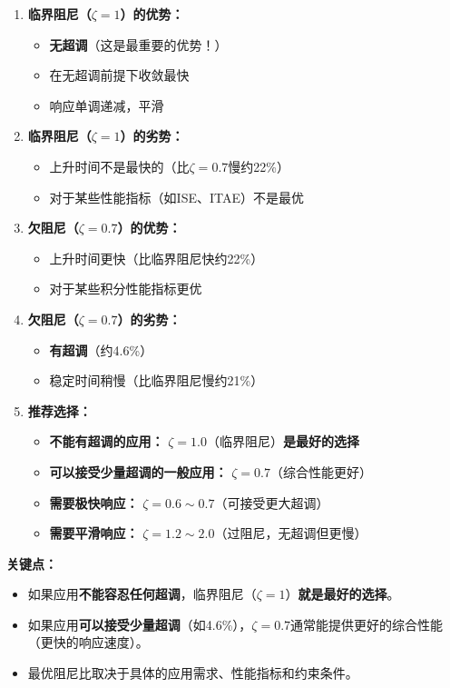 \documentclass[12pt,a4paper]{article}
\begin{document}
\begin{enumerate}
\item \textbf{临界阻尼（$\zeta = 1$）的优势：}
   \begin{itemize}
   \item \textbf{无超调}（这是最重要的优势！）
   \item 在无超调前提下收敛最快
   \item 响应单调递减，平滑
   \end{itemize}

\item \textbf{临界阻尼（$\zeta = 1$）的劣势：}
   \begin{itemize}
   \item 上升时间不是最快的（比$\zeta = 0.7$慢约22\%）
   \item 对于某些性能指标（如ISE、ITAE）不是最优
   \end{itemize}

\item \textbf{欠阻尼（$\zeta = 0.7$）的优势：}
   \begin{itemize}
   \item 上升时间更快（比临界阻尼快约22\%）
   \item 对于某些积分性能指标更优
   \end{itemize}

\item \textbf{欠阻尼（$\zeta = 0.7$）的劣势：}
   \begin{itemize}
   \item \textbf{有超调}（约4.6\%）
   \item 稳定时间稍慢（比临界阻尼慢约21\%）
   \end{itemize}

\item \textbf{推荐选择：}
   \begin{itemize}
   \item \textbf{不能有超调的应用：} $\zeta = 1.0$（临界阻尼）\textbf{是最好的选择}
   \item \textbf{可以接受少量超调的一般应用：} $\zeta = 0.7$（综合性能更好）
   \item \textbf{需要极快响应：} $\zeta = 0.6 \sim 0.7$（可接受更大超调）
   \item \textbf{需要平滑响应：} $\zeta = 1.2 \sim 2.0$（过阻尼，无超调但更慢）
   \end{itemize}
\end{enumerate}

\textbf{关键点：}
\begin{itemize}
\item 如果应用\textbf{不能容忍任何超调}，临界阻尼（$\zeta = 1$）\textbf{就是最好的选择}。
\item 如果应用\textbf{可以接受少量超调}（如4.6\%），$\zeta = 0.7$通常能提供更好的综合性能（更快的响应速度）。
\item 最优阻尼比取决于具体的应用需求、性能指标和约束条件。
\end{itemize}
\end{document}
